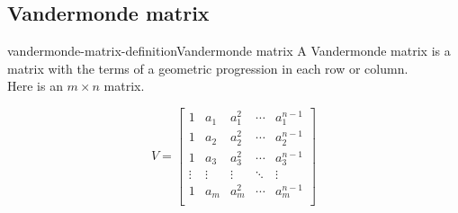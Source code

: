 \documentclass[preview]{standalone}
\begin{document}
\subsection{Vandermonde matrix}

\begin{snippetdefinition}{vandermonde-matrix-definition}{Vandermonde matrix}
    A Vandermonde matrix is a matrix with the terms of a geometric progression in each row or column. \\
    Here is an \(m \times n\) matrix.

    \[
        V =
        \begin{bmatrix}
            1 & a_1 & a_1^2 & \cdots & a_1^{n-1} \\
            1 & a_2 & a_2^2 & \cdots & a_2^{n-1} \\
            1 & a_3 & a_3^2 & \cdots & a_3^{n-1} \\
            \vdots & \vdots & \vdots & \ddots & \vdots \\
            1 & a_m & a_m^2 & \cdots & a_m^{n-1} \\
        \end{bmatrix}
    \]
\end{snippetdefinition}
\end{document}
